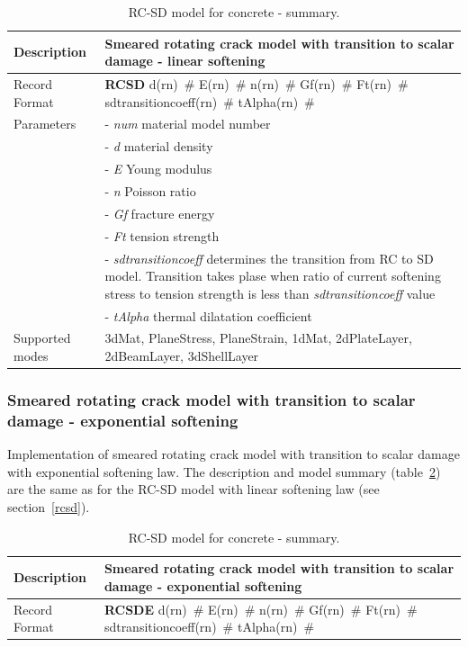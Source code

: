 \documentclass[a4paper]{article}
\newcommand{\descitem}[1]{{\noindent \bf #1}}
\newcommand{\elemparam}[2]{{{#1\tiny (#2)}~\#}}
\newcommand{\param}[1]{{\it #1}}
\begin{document}
\begin{table}[!htb]
\begin{tabular}{|l|p{9cm}|}
\hline
Description & Smeared rotating crack model with transition to scalar
damage - linear softening\\
\hline
Record Format & \descitem{RCSD} \elemparam{d}{rn} \elemparam{E}{rn}
\elemparam{n}{rn} \elemparam{Gf}{rn} \elemparam{Ft}{rn} \elemparam{sdtransitioncoeff}{rn} \elemparam{tAlpha}{rn} \\
Parameters &- \param{num} material model number\\
&- \param{d} material density\\
&- \param{E} Young modulus\\
&- \param{n} Poisson ratio\\
&- \param{Gf} fracture energy\\
&- \param{Ft} tension strength\\
&- \param{sdtransitioncoeff} determines the transition from RC to SD
model. Transition takes plase when ratio of current softening
stress to tension strength is less than  \param{sdtransitioncoeff} value\\
&- \param{tAlpha} thermal dilatation coefficient\\
Supported modes& 3dMat, PlaneStress, PlaneStrain, 1dMat,
2dPlateLayer, 2dBeamLayer, 3dShellLayer\\
\hline
\end{tabular}
\caption{RC-SD model for  concrete - summary.}
\label{rcsd_table}
\end{table}



\subsubsection{Smeared rotating crack model with transition to scalar
damage - exponential softening}
\label{rcsde}
Implementation of smeared rotating crack model with transition to
scalar damage with exponential softening law.
The description and model summary (table~\ref{rcsde_table}) are the
same as for the RC-SD model with linear softening law (see section~\ref{rcsd}).
\begin{table}[!htb]
\begin{tabular}{|l|p{9cm}|}
\hline
Description & Smeared rotating crack model with transition to scalar
damage - exponential softening\\
\hline
Record Format & \descitem{RCSDE} \elemparam{d}{rn} \elemparam{E}{rn}
\elemparam{n}{rn} \elemparam{Gf}{rn} \elemparam{Ft}{rn} \elemparam{sdtransitioncoeff}{rn} \elemparam{tAlpha}{rn} \\
\hline
\end{tabular}
\caption{RC-SD model for  concrete - summary.}
\label{rcsde_table}
\end{table}
\end{document}
